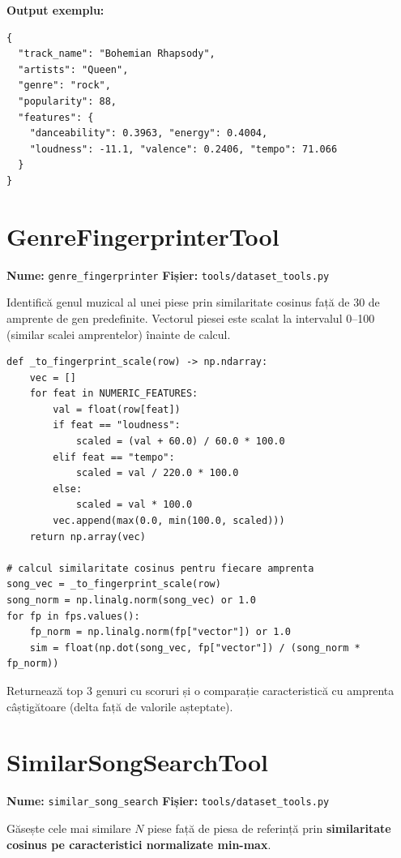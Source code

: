 \documentclass[12pt,a4paper]{report}
\begin{document}
\textbf{Output exemplu:}
\begin{lstlisting}[style=yaml]
{
  "track_name": "Bohemian Rhapsody",
  "artists": "Queen",
  "genre": "rock",
  "popularity": 88,
  "features": {
    "danceability": 0.3963, "energy": 0.4004,
    "loudness": -11.1, "valence": 0.2406, "tempo": 71.066
  }
}
\end{lstlisting}

\section{GenreFingerprinterTool}

\textbf{Nume:} \texttt{genre\_fingerprinter} \quad
\textbf{Fișier:} \texttt{tools/dataset\_tools.py}

Identifică genul muzical al unei piese prin similaritate cosinus față de 30 de
amprente de gen predefinite. Vectorul piesei este scalat la intervalul 0–100
(similar scalei amprentelor) înainte de calcul.

\begin{lstlisting}[style=python, caption={Scalarea la scara amprentei și calculul cosinus}]
def _to_fingerprint_scale(row) -> np.ndarray:
    vec = []
    for feat in NUMERIC_FEATURES:
        val = float(row[feat])
        if feat == "loudness":
            scaled = (val + 60.0) / 60.0 * 100.0
        elif feat == "tempo":
            scaled = val / 220.0 * 100.0
        else:
            scaled = val * 100.0
        vec.append(max(0.0, min(100.0, scaled)))
    return np.array(vec)

# calcul similaritate cosinus pentru fiecare amprenta
song_vec = _to_fingerprint_scale(row)
song_norm = np.linalg.norm(song_vec) or 1.0
for fp in fps.values():
    fp_norm = np.linalg.norm(fp["vector"]) or 1.0
    sim = float(np.dot(song_vec, fp["vector"]) / (song_norm * fp_norm))
\end{lstlisting}

Returnează top 3 genuri cu scoruri și o comparație caracteristică cu amprenta
câștigătoare (delta față de valorile așteptate).

\section{SimilarSongSearchTool}

\textbf{Nume:} \texttt{similar\_song\_search} \quad
\textbf{Fișier:} \texttt{tools/dataset\_tools.py}

Găsește cele mai similare $N$ piese față de piesa de referință prin
\textbf{similaritate cosinus pe caracteristici normalizate min-max}.
\end{document}
